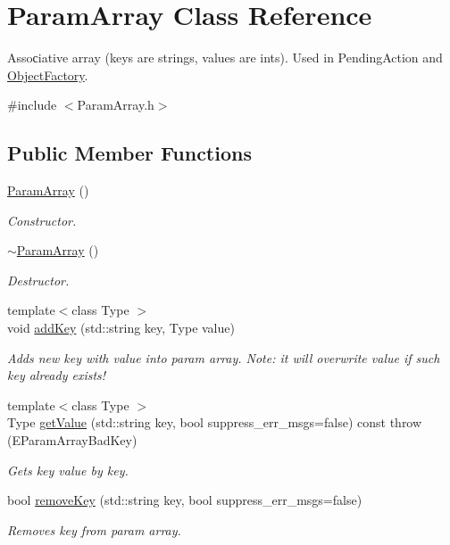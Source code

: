\hypertarget{classParamArray}{\section{Param\-Array Class Reference}
\label{classParamArray}
}


Assoсiative array (keys are strings, values are ints). Used in Pending\-Action and \hyperlink{classObjectFactory}{Object\-Factory}.  




{\ttfamily \#include $<$Param\-Array.\-h$>$}

\subsection*{Public Member Functions}
\begin{DoxyCompactItemize}
\item 
\hyperlink{classParamArray_a673c28a4afd5a62afe89ea2a2bab0459}{Param\-Array} ()
\begin{DoxyCompactList}\small\item\em Constructor. \end{DoxyCompactList}\item 
\hyperlink{classParamArray_a4d5619b3bdf2a29f2e3c0f98221831ac}{$\sim$\-Param\-Array} ()
\begin{DoxyCompactList}\small\item\em Destructor. \end{DoxyCompactList}\item 
{\footnotesize template$<$class Type $>$ }\\void \hyperlink{classParamArray_a01c7a07c832ce66628c182d7672ede54}{add\-Key} (std\-::string key, Type value)
\begin{DoxyCompactList}\small\item\em Adds new key with value into param array. Note\-: it will overwrite value if such key already exists! \end{DoxyCompactList}\item 
{\footnotesize template$<$class Type $>$ }\\Type \hyperlink{classParamArray_aa6a02f5bc77c494b9ebb9a3221d20fb3}{get\-Value} (std\-::string key, bool suppress\-\_\-err\-\_\-msgs=false) const   throw (\-E\-Param\-Array\-Bad\-Key)
\begin{DoxyCompactList}\small\item\em Gets key value by key. \end{DoxyCompactList}\item 
bool \hyperlink{classParamArray_a798aa6b9f71dde5cf7f8182695a5d748}{remove\-Key} (std\-::string key, bool suppress\-\_\-err\-\_\-msgs=false)
\begin{DoxyCompactList}\small\item\em Removes key from param array. \end{DoxyCompactList}\end{DoxyCompactItemize}


